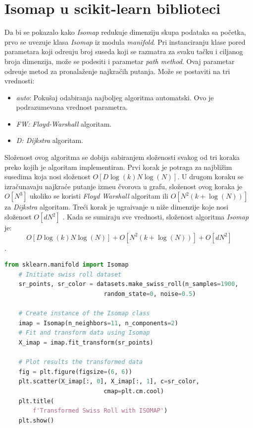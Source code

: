\section{\textenglish{Isomap} u \textenglish{scikit-learn} biblioteci}
Da bi se  pokazalo kako {\it \textenglish{Isomap}} redukuje dimenziju  skupa podataka sa po\v cetka, prvo se uvezuje klasa {\it\textenglish{Isomap}} iz modula {\it\textenglish{manifold}}. Pri instanciranju klase pored parametara koji odre\dj uju broj suseda koji se razmatra za svaku ta\v cku i ciljanog broja dimenzija, mo\v ze se podesiti i parametar {\it\textenglish{path method}}. Ovaj parametar odre\dj uje metod za pronala\v zenje najkra\' cih putanja. Mo\v ze se postaviti na tri vrednosti:
\begin{itemize}
    \item {\it\textenglish{auto}}: Poku\v saj odabiranja najboljeg algoritma automatski. Ovo je podrazumevana vrednost parametra.
    \item {\it\textenglish{FW: Floyd-Warshall}} algoritam.
    \item {\it\textenglish{D: Dijkstra}} algoritam.
\end{itemize}
Slo\v zenost ovog algoritma se dobija sabiranjem slo\v zenosti svakog od tri koraka preko kojih je algoritam implementiran. Prvi korak je potraga za najbli\v zim susedima koja nosi slo\v zenost  $O[D\log(k)N\log(N)]$. U drugom koraku se izra\v cunavaju najkra\' ce putanje izme\dj u \v cvorova u grafu, slo\v zenost ovog koraka je $O[N^{3}]$ ukoliko se koristi {\it\textenglish{Floyd Warshall}} algoritam ili $O[N^{2}(k + \log(N))]$ za {\it\textenglish{Dijkstra}} algoritam. Tre\' ci korak je ugra\dj ivanje u ni\v ze dimenzije koje nosi slo\v zenost $O[dN^{2}]$ \cite{SKLDOC}.
Kada se sumiraju sve vrednosti, slo\v zenost algoritma {\it\textenglish{Isomap}} je:\\ $$O[D\log(k)N\log(N)] + O[N^{2}(k + \log(N))] + O[dN^{2}]$$.

\begin{english}
\begin{lstlisting}[language=Python]
    from sklearn.manifold import Isomap
    # Initiate swiss roll dataset
    sr_points, sr_color = datasets.make_swiss_roll(n_samples=1900, 
                            random_state=0, noise=0.5)

    # Create instance of the Isomap class
    imap = Isomap(n_neighbors=11, n_components=2)
    # Fit and transform data using Isomap
    X_imap = imap.fit_transform(sr_points)

    # Plot results the transformed data
    fig = plt.figure(figsize=(6, 6))
    plt.scatter(X_imap[:, 0], X_imap[:, 1], c=sr_color, 
                            cmap=plt.cm.cool)
    plt.title(
        f'Transformed Swiss Roll with ISOMAP')
    plt.show()
\end{lstlisting}
\end{english}

